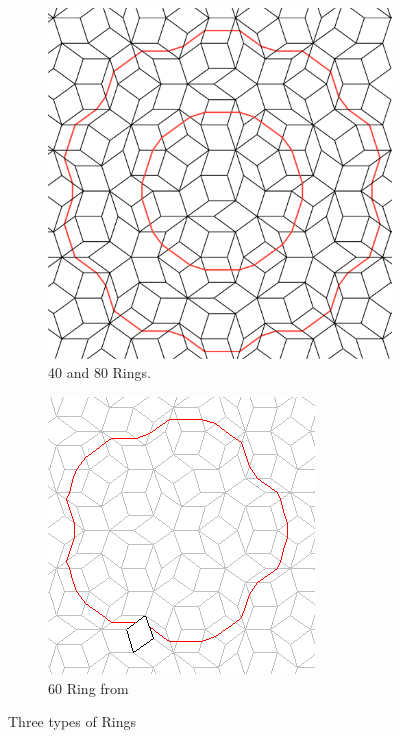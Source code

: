 \documentclass[
  oneside,
  11pt, a4paper,
  footinclude=true,
  headinclude=true,
  cleardoublepage=empty
]{scrbook}
\begin{document}
\begin{figure}[H]
\centering
\begin{subfigure}[b]{0.4\textwidth}
\includegraphics[width=\textwidth]{Rings}
\caption[Rings]{40 and 80 Rings.}
\end{subfigure}\hfill
\begin{subfigure}[b]{0.4\textwidth}
\includegraphics[width=\textwidth]{BobRing}
\caption[Rings]{60 Ring from \cite{Collins}}
\end{subfigure}
\caption[Rings]{Three types of Rings}
\end{figure}
\end{document}
